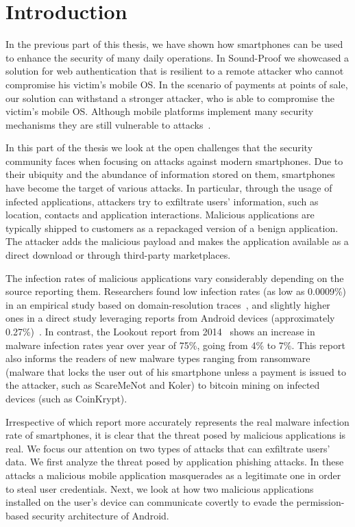 \chapter{Introduction}
\label{chap:sp_introduction}

In the previous part of this thesis, we have shown how smartphones can be used to enhance the security of many daily operations. In Sound-Proof we showcased a solution for web authentication that is resilient to a remote attacker who cannot compromise his victim's mobile OS. In the scenario of payments at points of sale, our solution can withstand a stronger attacker, who is able to compromise the victim's mobile OS. Although mobile platforms implement many security mechanisms they are still vulnerable to attacks~\cite{lookout2014,xcodeghost,malwaregenome,zhou-jiang12sp,Felt11}.

In this part of the thesis we look at the open challenges that the security community faces when focusing on attacks against modern smartphones. Due to their ubiquity and the abundance of information stored on them, smartphones have become the target of various attacks. In particular, through the usage of infected applications, attackers try to exfiltrate users' information, such as location, contacts and application interactions. Malicious applications are typically shipped to customers as a repackaged version of a benign application. The attacker adds the malicious payload and makes the application available as a direct download or through third-party marketplaces.

The infection rates of malicious applications vary considerably depending on the source reporting them. Researchers found low infection rates (as low as 0.0009\%) in an empirical study based on domain-resolution traces~\cite{lever-ndss13}, and slightly higher ones in a direct study leveraging reports from Android devices (approximately 0.27\%)~\cite{truong13}. In contrast, the Lookout report from 2014~\cite{lookout2014} shows an increase in malware infection rates year over year of 75\%, going from 4\% to 7\%. This report also informs the readers of new malware types ranging from ransomware (malware that locks the user out of his smartphone unless a payment is issued to the attacker, such as ScareMeNot and Koler) to bitcoin mining on infected devices (such as CoinKrypt).

Irrespective of which report more accurately represents the real malware infection rate of smartphones, it is clear that the threat posed by malicious applications is real. We focus our attention on two types of attacks that can exfiltrate users' data. We first analyze the threat posed by application phishing attacks. In these attacks a malicious mobile application masquerades as a legitimate one in order to steal user credentials. Next, we look at how two malicious applications installed on the user's device can communicate covertly to evade the permission-based security architecture of Android.


